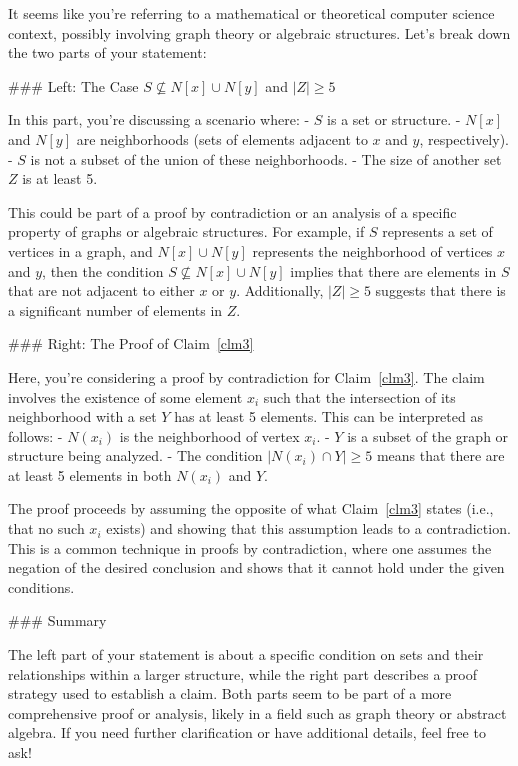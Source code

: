 It seems like you're referring to a mathematical or theoretical computer science context, possibly involving graph theory or algebraic structures. Let's break down the two parts of your statement:

### Left: The Case \( S \nsubseteq N[x] \cup N[y] \) and \( |Z| \geq 5 \)

In this part, you're discussing a scenario where:
- \( S \) is a set or structure.
- \( N[x] \) and \( N[y] \) are neighborhoods (sets of elements adjacent to \( x \) and \( y \), respectively).
- \( S \) is not a subset of the union of these neighborhoods.
- The size of another set \( Z \) is at least 5.

This could be part of a proof by contradiction or an analysis of a specific property of graphs or algebraic structures. For example, if \( S \) represents a set of vertices in a graph, and \( N[x] \cup N[y] \) represents the neighborhood of vertices \( x \) and \( y \), then the condition \( S \nsubseteq N[x] \cup N[y] \) implies that there are elements in \( S \) that are not adjacent to either \( x \) or \( y \). Additionally, \( |Z| \geq 5 \) suggests that there is a significant number of elements in \( Z \).

### Right: The Proof of Claim~\ref{clm3}

Here, you're considering a proof by contradiction for Claim~\ref{clm3}. The claim involves the existence of some element \( x_i \) such that the intersection of its neighborhood with a set \( Y \) has at least 5 elements. This can be interpreted as follows:
- \( N(x_i) \) is the neighborhood of vertex \( x_i \).
- \( Y \) is a subset of the graph or structure being analyzed.
- The condition \( |N(x_i) \cap Y| \geq 5 \) means that there are at least 5 elements in both \( N(x_i) \) and \( Y \).

The proof proceeds by assuming the opposite of what Claim~\ref{clm3} states (i.e., that no such \( x_i \) exists) and showing that this assumption leads to a contradiction. This is a common technique in proofs by contradiction, where one assumes the negation of the desired conclusion and shows that it cannot hold under the given conditions.

### Summary

The left part of your statement is about a specific condition on sets and their relationships within a larger structure, while the right part describes a proof strategy used to establish a claim. Both parts seem to be part of a more comprehensive proof or analysis, likely in a field such as graph theory or abstract algebra. If you need further clarification or have additional details, feel free to ask!
